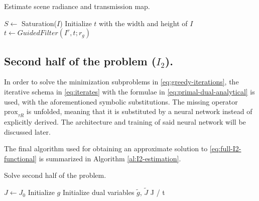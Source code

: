 \documentclass[twocolumn,twoside,a4paper,10pt]{IEEEtran}
\begin{document}
\begin{algorithm}\label{al:I1}
\caption{Estimate scene radiance and transmission map.}

\(S\gets \) Saturation(\(I\))\;
Initialize \(t\) with the width and height of \(I\)\;
\(t \gets GuidedFilter(I^r, t; r_g)\)\;

\end{algorithm}

\subsection{Second half of the problem (\(I_2\)).}
In order to solve the minimization subproblems in \cref{eq:greedy-iterations}, the iterative schema in \cref{eq:iterates} with the formulae in \cref{eq:primal-dual-analytical} is used, with the aforementioned symbolic substitutions. The missing operator \(\text{prox}_{\tau R}\) is unfolded, meaning that it is substituted by a neural network instead of explicitly derived. The architecture and training of said neural network will be discussed later.

The final algorithm used for obtaining an approximate solution to \cref{eq:full-I2-functional} is summarized in Algorithm \ref{al:I2-estimation}.

\begin{algorithm}\caption{Solve second half of the problem.}
\label{al:I2-estimation}
\KwData{\sigma, \tau}
\(J\gets J_0\)\;
Initialize \(g\)\; 
Initialize dual variables \(\tilde{g}\), \(\tilde{J}\)\;
\Return J / t
\end{algorithm}
\end{document}
